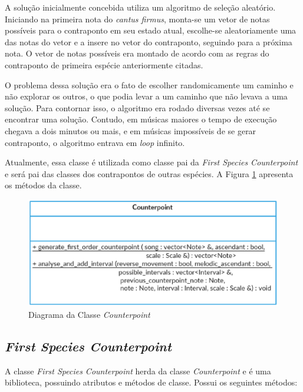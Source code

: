     A solução inicialmente concebida utiliza um algoritmo de seleção aleatório. Iniciando na primeira nota do \textit{cantus firmus}, monta-se um vetor de notas possíveis para o contraponto em seu estado atual, escolhe-se aleatoriamente uma das notas do vetor e a insere no vetor do contraponto, seguindo para a próxima nota. O vetor de notas possíveis era montado de acordo com as regras do contraponto de primeira espécie anteriormente citadas.

    O problema dessa solução era o fato de escolher randomicamente um caminho e não explorar os outros, o que podia levar a um caminho que não levava a uma solução. Para contornar isso, o algoritmo era rodado diversas vezes até se encontrar uma solução. Contudo, em músicas maiores o tempo de execução chegava a dois minutos ou mais, e em músicas impossíveis de se gerar contraponto, o algoritmo entrava em \textit{loop} infinito.

    Atualmente, essa classe é utilizada como classe pai da \textit{First Species Counterpoint} e será pai das classes dos contrapontos de outras espécies. A Figura \ref{counterpointclass} apresenta os métodos da classe.

    \begin{figure}[htb]
      \centering
      \includegraphics[scale=0.7]{figuras/counterpointclass.eps}
      \caption{Diagrama da Classe \textit{Counterpoint}}
      \label{counterpointclass}
    \end{figure}

    \subsection[\textit{First Species Counterpoint}]{\textit{First Species Counterpoint}}

      A classe \textit{First Species Counterpoint} herda da classe \textit{Counterpoint} e é uma biblioteca, possuindo atributos e métodos de classe. Possui os seguintes métodos:

